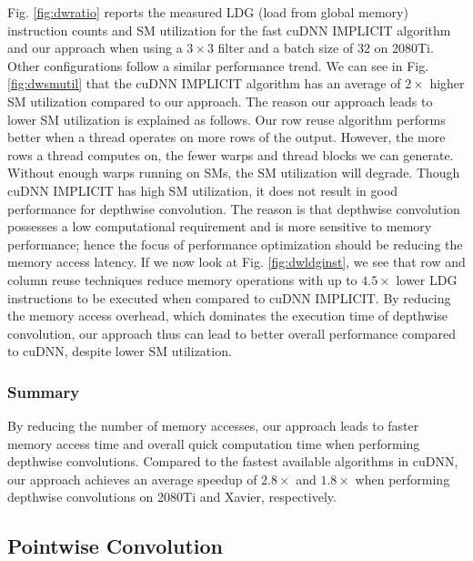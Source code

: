 Fig. \ref{fig:dwratio} reports the measured LDG (load from global memory) instruction counts and SM utilization for the fast cuDNN IMPLICIT
algorithm and our approach when using a $3 \times 3$ filter and a batch size of 32 on 2080Ti. Other configurations follow a similar
performance trend. We can see in Fig. \ref{fig:dwsmutil} that the cuDNN IMPLICIT algorithm has an average of $2\times$ higher SM
utilization compared to our approach. The reason our approach leads to lower SM utilization is explained as follows. Our row reuse
algorithm performs better when a thread operates on more rows of the output. However, the more rows a thread computes on, the fewer warps
and thread blocks we can generate. Without enough warps running on SMs, the SM utilization will degrade. Though cuDNN IMPLICIT has high SM
utilization, it does not result in good performance for depthwise convolution. The reason is that depthwise convolution possesses a low
computational requirement and is more sensitive to memory performance; hence the focus of performance optimization should be reducing the
memory access latency.  If we now look at Fig. \ref{fig:dwldginst}, we see that row and column reuse techniques reduce memory operations
with up to $4.5\times$ lower LDG instructions to be executed when compared to cuDNN IMPLICIT. By reducing the memory access overhead, which
dominates the execution time of depthwise convolution, our approach thus can lead to better overall performance compared to cuDNN, despite
lower SM utilization.


\subsubsection{Summary}
By reducing the number of memory accesses, our approach leads to faster memory access time and overall quick computation time when
performing depthwise convolutions. Compared to the fastest available algorithms in cuDNN, our approach achieves an average speedup of
$2.8\times$ and $1.8\times$ when performing depthwise convolutions on 2080Ti and Xavier, respectively.


\subsection{Pointwise Convolution}
\label{sec:pwconvexp}


